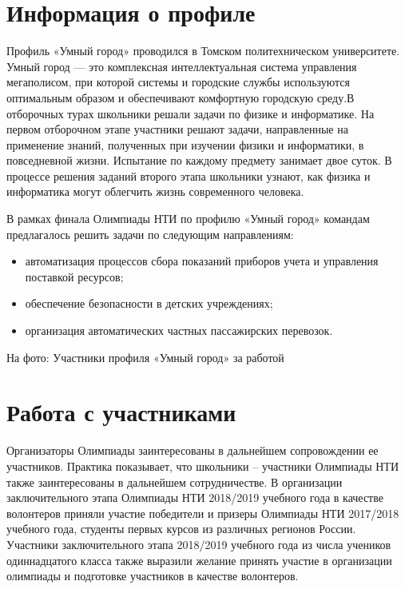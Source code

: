 \section*{Информация о профиле}

Профиль «Умный город» проводился в Томском политехническом университете. Умный город — это комплексная интеллектуальная система управления мегаполисом, при которой системы и городские службы используются оптимальным образом и обеспечивают комфортную городскую среду.В отборочных турах школьники решали задачи по физике и информатике. На первом отборочном этапе участники решают задачи, направленные на применение знаний, полученных при изучении физики и информатики, в повседневной жизни. Испытание по каждому предмету занимает двое суток. В процессе решения заданий второго этапа школьники узнают, как физика и информатика могут облегчить жизнь современного человека.

В рамках финала Олимпиады НТИ по профилю «Умный город» командам предлагалось решить задачи по следующим направлениям:
\begin{itemize}
    \item автоматизация процессов сбора показаний приборов учета и управления поставкой ресурсов;
    \item обеспечение безопасности в детских учреждениях;
    \item организация автоматических частных пассажирских перевозок.
\end{itemize}


\begin{center}
    На фото: Участники профиля «Умный город» за работой
\end{center}

\section*{Работа с участниками}

Организаторы Олимпиады заинтересованы в дальнейшем сопровождении ее участников. Практика показывает, что школьники  –  участники Олимпиады НТИ также заинтересованы в дальнейшем сотрудничестве. В организации заключительного этапа Олимпиады НТИ 2018/2019 учебного года в качестве волонтеров приняли участие победители и призеры Олимпиады НТИ 2017/2018 учебного года, студенты первых курсов из различных регионов России. Участники заключительного этапа 2018/2019 учебного года из числа учеников одиннадцатого класса также выразили желание принять участие в организации олимпиады и подготовке участников в качестве волонтеров.  

